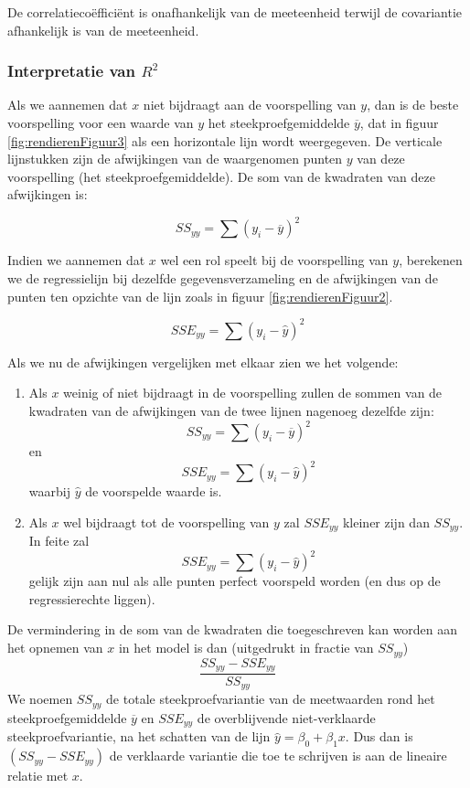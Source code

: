 De correlatieco\"effici\"ent is onafhankelijk van de meeteenheid terwijl de covariantie afhankelijk is van de meeteenheid.

\subsubsection{Interpretatie van $R^{2}$}

Als we aannemen dat $x$ niet bijdraagt aan de voorspelling van $y$, dan is de beste voorspelling voor een waarde van $y$ het steekproefgemiddelde $\overline{y}$, dat in figuur \ref{fig:rendierenFiguur3} als een horizontale lijn wordt weergegeven. De verticale lijnstukken zijn de afwijkingen van de waargenomen punten $y$ van deze voorspelling (het steekproefgemiddelde). De som van de kwadraten van deze afwijkingen is:

\[ SS_{yy} = \sum(y_{i} - \overline{y})^{2} \]

Indien we aannemen dat $x$ wel een rol speelt bij de voorspelling van $y$, berekenen we de regressielijn bij dezelfde gegevensverzameling en de afwijkingen van de punten ten opzichte van de lijn zoals in figuur \ref{fig:rendierenFiguur2}.

\[ SSE_{yy} = \sum(y_{i} - \widehat{y})^{2} \]

 Als we nu de afwijkingen vergelijken met elkaar zien we het volgende:
\begin{enumerate}
  \item Als $x$ weinig of niet bijdraagt in de voorspelling zullen de sommen van de kwadraten van de afwijkingen van de twee lijnen nagenoeg dezelfde zijn:
    \[ SS_{yy} = \sum(y_{i} - \overline{y})^{2} \] en
    \[ SSE_{yy} = \sum(y_{i} - \widehat{y})^{2} \]
    waarbij $\widehat{y}$ de voorspelde waarde is.
  \item Als $x$ wel bijdraagt tot de voorspelling van $y$ zal $SSE_{yy}$ kleiner zijn dan $SS_{yy}$. In feite zal
    \[	SSE_{yy} = \sum(y_{i} - \widehat{y})^{2} \]
    gelijk zijn aan nul als alle punten perfect voorspeld worden (en dus op de regressierechte liggen).
\end{enumerate}

De vermindering in de som van de kwadraten die toegeschreven kan worden aan het opnemen van $x$ in het model is dan (uitgedrukt in fractie van $SS_{yy}$)
\[ \frac{SS_{yy} - SSE_{yy}}{SS_{yy}} \]
We noemen $SS_{yy}$ de totale steekproefvariantie van de meetwaarden rond het steekproefgemiddelde $\overline{y}$ en $SSE_{yy}$ de overblijvende niet-verklaarde steekproefvariantie, na het schatten van de lijn $\widehat{y} = \beta_{0} + \beta_{1}x$. Dus dan is $(SS_{yy} - SSE_{yy})$ de verklaarde variantie die toe te schrijven is aan de lineaire relatie met $x$.

